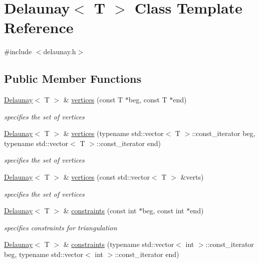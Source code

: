 \hypertarget{classDelaunay}{}\section{Delaunay$<$ T $>$ Class Template Reference}
\label{classDelaunay}


{\ttfamily \#include $<$delaunay.\+h$>$}

\subsection*{Public Member Functions}
\begin{DoxyCompactItemize}
\item 
\hyperlink{classDelaunay}{Delaunay}$<$ T $>$ \& \hyperlink{classDelaunay_a86f2c0124e6326aa9b73b3bf472818e8}{vertices} (const T $\ast$beg, const T $\ast$end)
\begin{DoxyCompactList}\small\item\em specifies the set of vertices \end{DoxyCompactList}\item 
\hyperlink{classDelaunay}{Delaunay}$<$ T $>$ \& \hyperlink{classDelaunay_a9ca7e6d7b2b218dad444db23b929d694}{vertices} (typename std\+::vector$<$ T $>$\+::const\+\_\+iterator beg, typename std\+::vector$<$ T $>$\+::const\+\_\+iterator end)
\begin{DoxyCompactList}\small\item\em specifies the set of vertices \end{DoxyCompactList}\item 
\hyperlink{classDelaunay}{Delaunay}$<$ T $>$ \& \hyperlink{classDelaunay_a0cbb2dd64104569381f94772b498cbd2}{vertices} (const std\+::vector$<$ T $>$ \&verts)
\begin{DoxyCompactList}\small\item\em specifies the set of vertices \end{DoxyCompactList}\item 
\hyperlink{classDelaunay}{Delaunay}$<$ T $>$ \& \hyperlink{classDelaunay_acfb314c74b4ad94b280e23fcb7b06a55}{constraints} (const int $\ast$beg, const int $\ast$end)
\begin{DoxyCompactList}\small\item\em specifies constraints for triangulation \end{DoxyCompactList}\item 
\hyperlink{classDelaunay}{Delaunay}$<$ T $>$ \& \hyperlink{classDelaunay_affc039ffdefcfbe4edf3f68738cd7855}{constraints} (typename std\+::vector$<$ int $>$\+::const\+\_\+iterator beg, typename std\+::vector$<$ int $>$\+::const\+\_\+iterator end)

\end{DoxyCompactItemize}
